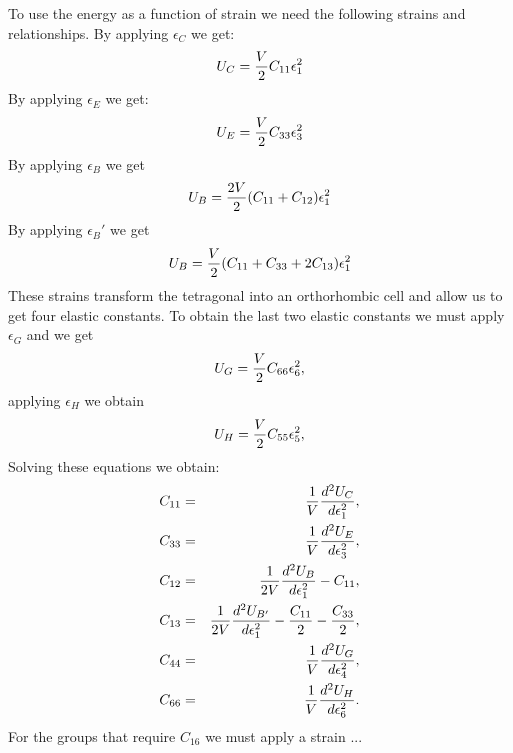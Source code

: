 \documentclass[12pt,a4paper]{article}
\begin{document}
To use the energy as a function of strain 
we need the following strains and relationships. 
By applying $\epsilon_C$ we get:
\begin{equation}
U_C= {V \over 2} C_{11} \epsilon_1^2
\end{equation}
By applying $\epsilon_E$ we get:
\begin{equation}
U_E= {V \over 2} C_{33} \epsilon_3^2
\end{equation}
By applying $\epsilon_B$ we get
\begin{equation}
U_B= {2 V \over 2} (C_{11} + C_{12}) \epsilon_1^2
\end{equation}
By applying $\epsilon_B'$ we get
\begin{equation}
U_B= {V \over 2} (C_{11} + C_{33} + 2 C_{13}) \epsilon_1^2
\end{equation}
These strains transform the tetragonal into an orthorhombic cell 
and allow us to get four elastic constants. 
To obtain the last two elastic constants we 
must apply $\epsilon_G$ and we get
\begin{equation}
U_G= {V \over 2} C_{66} \epsilon_6^2,
\end{equation}
applying $\epsilon_H$ we obtain
\begin{equation}
U_H= {V \over 2} C_{55} \epsilon_5^2,
\end{equation}
Solving these equations we obtain:
\begin{eqnarray}
C_{11}&=&{1 \over V} {d^2 U_C \over d \epsilon_1^2}, \\ 
C_{33}&=&{1 \over V} {d^2 U_E \over d \epsilon_3^2}, \\ 
C_{12}&=&{1 \over 2 V} {d^2 U_B \over d \epsilon_1^2} - C_{11}, \\
C_{13}&=&{1 \over 2 V} {d^2 U_{B'} \over d \epsilon_1^2} - {C_{11} \over 2} 
                                                         - {C_{33} \over 2}, \\
C_{44}&=&{1 \over V} {d^2 U_G \over d \epsilon_4^2}, \\
C_{66}&=&{1 \over V} {d^2 U_H \over d \epsilon_6^2}.
\end{eqnarray}
For the groups that require $C_{16}$ we must apply a strain ...
\end{document}
